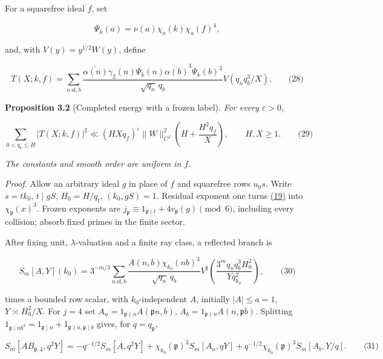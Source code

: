 For a squarefree ideal \(f\), set

\[
\Psi_k(a)=\nu(a)\chi_a(k)\chi_a(f)^4,
\]

and, with \(V(y)=y^{1/2}W(y)\), define

\hypertarget{cf:eq:B.12}{}

\label{cf:eq:B.12}

\[
T(X;k,f)=\sum_{n\ \mathrm{sf},b}
\frac{\overline{\alpha(n)}\gamma_2(n)\Psi_k(n)
\overline{\alpha(b)}^{3}\Psi_k(b)^3}{\sqrt{q_n}\,q_b}
V(q_nq_b^3/X).
\qquad\text{(28)}
\]

\textbf{Proposition 3.2} (Completed energy with a frozen label). \emph{\hypertarget{cf:completed-energy}{}\label{cf:completed-energy} For every \(\varepsilon>0\), \hypertarget{cf:eq:B.13}{}\label{cf:eq:B.13}}

\[
\sum_{0<q_k\le H}|T(X;k,f)|^2
\ll(HXq_f)^\varepsilon\|W\|_{C^J}^2
\left(H+\frac{H^2q_f}{X}\right),\qquad H,X\ge1.
\qquad\text{(29)}
\]

\emph{The constants and smooth order are uniform in \(f\).}

\emph{Proof.} Allow an arbitrary ideal \(g\) in place of \(f\) and squarefree rows \(u_0s\). Write \(s=tk_0\), \(t\mid gS\), \(H_0=H/q_t\), \((k_0,gS)=1\). Residual exponent one turns \protect\hyperlink{cf:eq:B.3}{(19)} into \(\chi_{\mathfrak p}(x)^3\). Frozen exponents are \(j_{\mathfrak p}\equiv1_{\mathfrak p\mid t}+4v_{\mathfrak p}(g)\pmod6\), including every collision; absorb fixed primes in the finite sector.

After fixing unit, \(\lambda\)-valuation and a finite ray class, a reflected branch is

\hypertarget{cf:eq:B.14}{}

\label{cf:eq:B.14}

\[
S_m[A,Y](k_0)=3^{-m/3}\sum_{n\ \mathrm{sf},b}
\frac{A(n,b)\chi_{k_0}(nb)^3}{\sqrt{q_n}\,q_b}
V^\sharp\!\left(\frac{3^mq_nq_b^3H_0^2}{Yq_{k_0}^2}\right),
\qquad\text{(30)}
\]

times a bounded row scalar, with \(k_0\)-independent \(A\), initially \(|A|\le a=1\), \(Y\asymp H_0^2/X\). For \(j=4\) set \(A_n=1_{\mathfrak p\nmid n}A(\mathfrak pn,b)\), \(A_b=1_{\mathfrak p\nmid n}A(n,\mathfrak pb)\). Splitting \(1_{\mathfrak p\mid nb^3}=1_{\mathfrak p\mid n}+1_{\mathfrak p\nmid n,\mathfrak p\mid b}\) gives, for \(q=q_{\mathfrak p}\),

\hypertarget{cf:eq:B.15}{}

\label{cf:eq:B.15}

\[
S_m[AB_{\mathfrak p,4},q^2Y]
=-q^{-1/2}S_m[A,q^2Y]
+\chi_{k_0}(\mathfrak p)^3S_m[A_n,qY]
+q^{-1/2}\chi_{k_0}(\mathfrak p)^3S_m[A_b,Y/q].
\qquad\text{(31)}
\]

